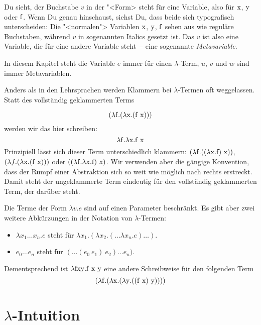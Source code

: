 Du sieht, der Buchstabe $v$ in der "<Form> steht für eine Variable,
also für $\mathrm x$, $\mathrm y$ oder $\mathrm f$.  Wenn Du genau hinschaust,
siehst Du, dass beide sich typografisch unterscheiden: Die
"<normalen"> Variablen $\mathrm x$, $\mathrm y$, $\mathrm f$ sehen aus wie
reguläre Buchstaben, während $v$ in sogenannten Italics gesetzt ist.
Das $v$ ist also eine Variable, die für eine andere Variable steht~--
eine sogenannte \textit{Metavariable}.

In diesem Kapitel steht die Variable $e$ immer für einen
$\lambda$-Term, $u$, $v$ und $w$ sind immer Metavariablen.

Anders als in den Lehrsprachen werden Klammern bei $\lambda$-Termen
oft weggelassen.  Statt des vollständig geklammerten Terms

\begin{displaymath}
  (\lambda \mathrm f.(\lambda \mathrm x.(\mathrm f~\mathrm x)))
\end{displaymath}
%
werden wir das hier schreiben: 
%
\begin{displaymath}
  \lambda \mathrm f.\lambda \mathrm x.\mathrm f~\mathrm x
\end{displaymath}
%
Prinzipiell lässt sich dieser Term unterschiedlich
klammern: $(\lambda \mathrm f.((\lambda \mathrm x.\mathrm f)~\mathrm x))$, $(\lambda
f.(\lambda \mathrm x.(\mathrm f~\mathrm x)))$ oder $((\lambda \mathrm f.\lambda
\mathrm x.\mathrm f)~\mathrm x)$.  Wir verwenden aber die gängige Konvention,
dass der Rumpf einer Abstraktion sich so weit wie möglich nach
rechts erstreckt.   Damit steht der ungeklammerte Term eindeutig für
den vollständig geklammerten Term, der darüber steht.

Die Terme der Form $\lambda v.e$ sind auf einen Parameter
beschränkt.  Es gibt aber zwei weitere Abkürzungen
in der Notation von $\lambda$-Termen:
%
\begin{itemize}
\item $\lambda x_1 \ldots x_n.e$ steht für $\lambda x_1.(\lambda
  x_2.(\ldots\lambda x_n.e)\ldots)$.
\item $e_0 \ldots e_n$ steht für $(\ldots(e_0~e_1)~e_2) \ldots e_n)$.
\end{itemize}
%
Dementsprechend ist $\lambda \mathrm{fxy}.\mathrm f~\mathrm x~\mathrm y$ eine andere Schreibweise für
den folgenden Term \[(\lambda \mathrm f.(\lambda \mathrm x.(\lambda \mathrm y.((\mathrm f~\mathrm x)~\mathrm y))))\]

\section{$\lambda$-Intuition}

